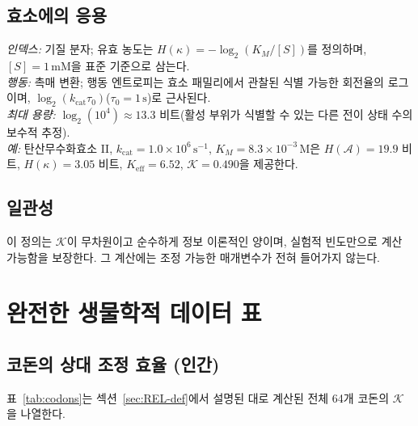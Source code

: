 \documentclass[12pt,a4paper]{article}
\newcommand{\REL}{\mathcal{K}}          %
\newcommand{\ABS}{K_{\mathrm{eff}}}     %
\begin{document}
	\subsection{효소에의 응용}
	\textit{인덱스:} 기질 분자; 유효 농도는 \(H(\kappa) = -\log_2(K_M/[S])\)를 정의하며, \([S]=1\,\text{mM}\)을 표준 기준으로 삼는다.\\
	\textit{행동:} 촉매 변환; 행동 엔트로피는 효소 패밀리에서 관찰된 식별 가능한 회전율의 로그이며, \(\log_2(k_{\mathrm{cat}}\tau_0)\)(\(\tau_0=1\,\text{s}\))로 근사된다.\\
	\textit{최대 용량:} \(\log_2(10^4)\approx13.3\) 비트(활성 부위가 식별할 수 있는 다른 전이 상태 수의 보수적 추정).\\
	\textit{예:} 탄산무수화효소 II, \(k_{\mathrm{cat}}=1.0\times10^6\,\text{s}^{-1}\), \(K_M=8.3\times10^{-3}\,\text{M}\)은 \(H(\mathcal{A})=19.9\) 비트, \(H(\kappa)=3.05\) 비트, \(\ABS=6.52\), \(\REL=0.490\)을 제공한다.
	
	\subsection{일관성}
	이 정의는 \(\REL\)이 무차원이고 순수하게 정보 이론적인 양이며, 실험적 빈도만으로 계산 가능함을 보장한다. 그 계산에는 조정 가능한 매개변수가 전혀 들어가지 않는다.
	
	\section{완전한 생물학적 데이터 표}
	\label{sec:tables}
	
	\subsection{코돈의 상대 조정 효율 (인간)}
	\label{sec:codons}
	표~\ref{tab:codons}는 섹션~\ref{sec:REL-def}에서 설명된 대로 계산된 전체 64개 코돈의 \(\REL\)을 나열한다.
	
\end{document}
